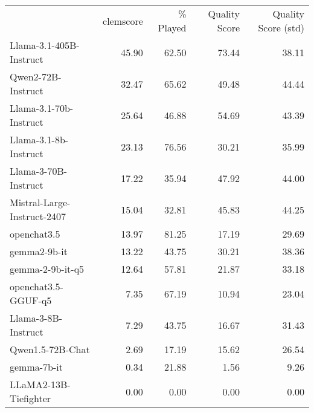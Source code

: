 \begin{tabular}{lrrrr}
\hline
 & clemscore & \% Played & Quality Score & Quality Score (std) \\
Llama-3.1-405B-Instruct & 45.90 & 62.50 & 73.44 & 38.11 \\
Qwen2-72B-Instruct & 32.47 & 65.62 & 49.48 & 44.44 \\
Llama-3.1-70b-Instruct & 25.64 & 46.88 & 54.69 & 43.39 \\
Llama-3.1-8b-Instruct & 23.13 & 76.56 & 30.21 & 35.99 \\
Llama-3-70B-Instruct & 17.22 & 35.94 & 47.92 & 44.00 \\
Mistral-Large-Instruct-2407 & 15.04 & 32.81 & 45.83 & 44.25 \\
openchat3.5 & 13.97 & 81.25 & 17.19 & 29.69 \\
gemma2-9b-it & 13.22 & 43.75 & 30.21 & 38.36 \\
gemma-2-9b-it-q5 & 12.64 & 57.81 & 21.87 & 33.18 \\
openchat3.5-GGUF-q5 & 7.35 & 67.19 & 10.94 & 23.04 \\
Llama-3-8B-Instruct & 7.29 & 43.75 & 16.67 & 31.43 \\
Qwen1.5-72B-Chat & 2.69 & 17.19 & 15.62 & 26.54 \\
gemma-7b-it & 0.34 & 21.88 & 1.56 & 9.26 \\
LLaMA2-13B-Tiefighter & 0.00 & 0.00 & 0.00 & 0.00 \\
\hline
\end{tabular}
